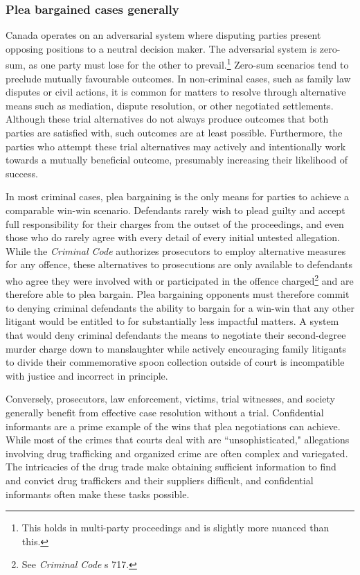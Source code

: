 \subsubsection{Plea bargained cases generally}

Canada operates on an adversarial system where disputing parties present opposing positions to a neutral decision maker. The adversarial system is zero-sum, as one party must lose for the other to prevail.\footnote{This holds in multi-party proceedings and is slightly more nuanced than this.} Zero-sum scenarios tend to preclude mutually favourable outcomes. In non-criminal cases, such as family law disputes or civil actions, it is common for matters to resolve through alternative means such as mediation, dispute resolution, or other negotiated settlements. Although these trial alternatives do not always produce outcomes that both parties are satisfied with, such outcomes are at least possible. Furthermore, the parties who attempt these trial alternatives may actively and intentionally work towards a mutually beneficial outcome, presumably increasing their likelihood of success.

In most criminal cases, plea bargaining is the only means for parties to achieve a comparable win-win scenario. Defendants rarely wish to plead guilty and accept full responsibility for their charges from the outset of the proceedings, and even those who do rarely agree with every detail of every initial untested allegation. While the \textit{Criminal Code} authorizes prosecutors to employ alternative measures for any offence, these alternatives to prosecutions are only available to defendants who agree they were involved with or participated in the offence charged\footnote{See \textit{Criminal Code} s 717.} and are therefore able to plea bargain. Plea bargaining opponents must therefore commit to denying criminal defendants the ability to bargain for a win-win that any other litigant would be entitled to for substantially less impactful matters. A system that would deny criminal defendants the means to negotiate their second-degree murder charge down to manslaughter while actively encouraging family litigants to divide their commemorative spoon collection outside of court is incompatible with justice and incorrect in principle.

Conversely, prosecutors, law enforcement, victims, trial witnesses, and society generally benefit from effective case resolution without a trial. Confidential informants are a prime example of the wins that plea negotiations can achieve. While most of the crimes that courts deal with are ``unsophisticated," allegations involving drug trafficking and organized crime are often complex and variegated. The intricacies of the drug trade make obtaining sufficient information to find and convict drug traffickers and their suppliers difficult, and confidential informants often make these tasks possible.


